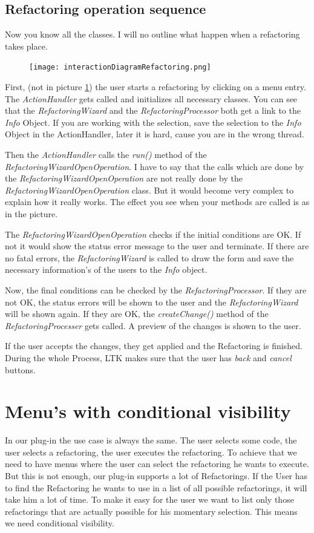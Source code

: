 \documentclass[a4paper,10pt]{report}
\begin{document}
\section{Refactoring operation sequence}
Now you know all the classes. I will no outline what happen when a refactoring takes place. 
\begin{figure}[h]
\centering
\texttt{[image: interactionDiagramRefactoring.png]}
\label{ interactionDiagramRefactoring }
\end{figure}
First, (not in picture \ref{ interactionDiagramRefactoring }) the user starts a refactoring by clicking on a menu entry. The {\it ActionHandler} gets called and initializes all necessary classes.
You can see that the {\it RefactoringWizard} and the {\it RefactoringProcessor} both get a link to the {\it Info} Object. If you are working with the selection, save
the selection to the {\it Info} Object in the ActionHandler, later it is hard, cause you are in the wrong thread.

Then the {\it ActionHandler} calls the {\it run()} method of the {\it RefactoringWizardOpenOperation}. I have to say that the calls which are done by the
{\it RefactoringWizardOpenOperation} are not really done by the {\it RefactoringWizardOpenOperation} class. But it would become very complex to explain how it really works.
The effect you see when your methods are called is as in the picture.

The {\it RefactoringWizardOpenOperation} checks if the initial conditions are OK. If not it would show the status error message to the user and terminate. If there
are no fatal errors, the {\it RefactoringWizard} is called to draw the form and save the necessary information's of the users to the {\it Info} object.

Now, the final conditions can be checked by the {\it RefactoringProcessor}. If they are not OK, the status errors will be shown to the user and the {\it RefactoringWizard}
will be shown again. If they are OK, the {\it createChange()} method of the {\it RefactoringProcesser} gets called. A preview of the changes is shown to the user.

If the user accepts the changes, they get applied and the Refactoring is finished. During the whole Process, LTK makes sure that the user has {\it back} and {\it cancel} buttons.

\chapter{Menu's with conditional visibility}
\label{menuWithConditionalVisibility}
In our plug-in the use case is always the same. The user selects some code, the user selects a refactoring, the user executes the refactoring. To achieve that we need to have menus where the user can select the refactoring he wants to execute.
But this is not enough, our plug-in supports a lot of Refactorings. If the User has to find the Refactoring he wants to use in a list of all possible refactorings, it will take him a lot of time.
To make it easy for the user we want to list only those refactorings that are actually possible for his momentary selection. This means we need conditional visibility.
\end{document}
